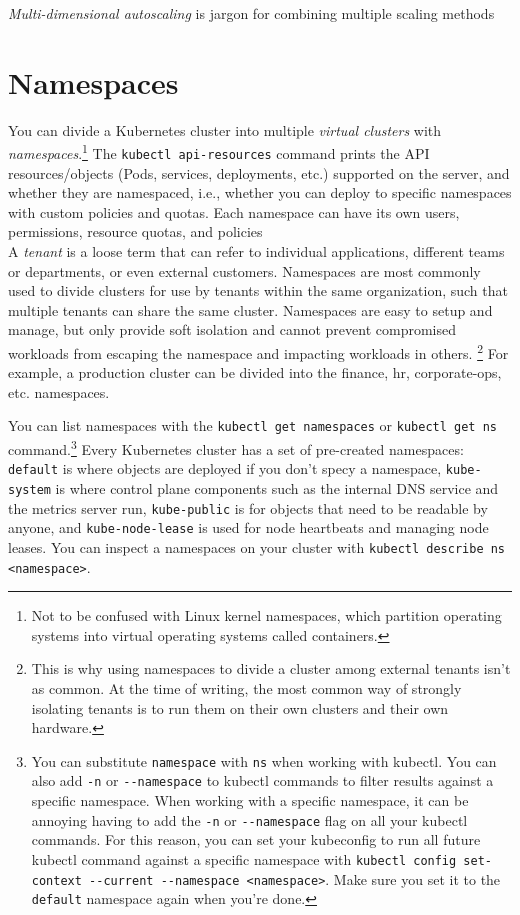 \documentclass[8pt, table, xcdraw]{article}%
\begin{document}
\emph{Multi-dimensional autoscaling} is jargon for combining multiple scaling methods 

\section{Namespaces}

You can divide a Kubernetes cluster into multiple \emph{virtual clusters} with \emph{namespaces}.\footnote{Not to be confused with Linux kernel namespaces, which partition operating systems into virtual operating systems called containers.} The \lstinline{kubectl api-resources} command prints the API resources/objects (Pods, services, deployments, etc.) supported on the server, and whether they are namespaced, i.e., whether you can deploy to specific namespaces with custom policies and quotas. Each namespace can have its own users, permissions, resource quotas, and policies\\
A \emph{tenant} is a loose term that can refer to individual applications, different teams or departments, or even external customers. Namespaces are most commonly used to divide clusters for use by tenants within the same organization, such that multiple tenants can share the same cluster. Namespaces are easy to setup and manage, but only provide soft isolation and cannot prevent compromised workloads from escaping the namespace and impacting workloads in others. \footnote{This is why using namespaces to divide a cluster among external tenants isn’t as common. At the time of writing, the most common way of strongly isolating tenants is to run them on their own clusters and their own hardware.} For example, a production cluster can be divided into the finance, hr, corporate-ops, etc. namespaces.

You can list namespaces with the \lstinline{kubectl get namespaces} or \lstinline{kubectl get ns} command.\footnote{You can substitute \lstinline{namespace} with \lstinline{ns} when working with kubectl. You can also add \lstinline{-n} or \lstinline{--namespace} to kubectl commands to filter results against a specific namespace. When working with a specific namespace, it can be annoying having to add the \lstinline{-n} or \lstinline{--namespace} flag on all your kubectl commands. For this reason, you can set your kubeconfig to run all future kubectl command against a specific namespace with \lstinline{kubectl config set-context --current --namespace <namespace>}. Make sure you set it to the \lstinline{default} namespace again when you're done.} Every Kubernetes cluster has a set of pre-created namespaces: \lstinline{default} is where objects are deployed if you don't specy a namespace, \lstinline{kube-system} is where control plane components such as the internal DNS service and the metrics server run, \lstinline{kube-public} is for objects that need to be readable by anyone, and \lstinline{kube-node-lease} is used for node heartbeats and managing node leases. You can inspect a namespaces on your cluster with \lstinline{kubectl describe ns <namespace>}.
\end{document}
